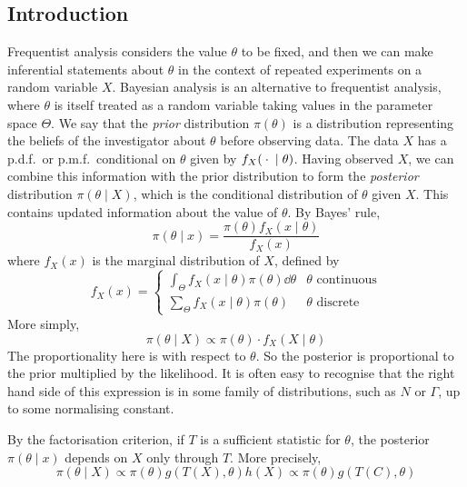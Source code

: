 \subsection{Introduction}
Frequentist analysis considers the value \( \theta \) to be fixed, and then we can make inferential statements about \( \theta \) in the context of repeated experiments on a random variable \( X \).
Bayesian analysis is an alternative to frequentist analysis, where \( \theta \) is itself treated as a random variable taking values in the parameter space \( \Theta \).
We say that the \textit{prior} distribution \( \pi(\theta) \) is a distribution representing the beliefs of the investigator about \( \theta \) before observing data.
The data \( X \) has a p.d.f.\ or p.m.f.\ conditional on \( \theta \) given by \( f_X({}\cdot{} \mid \theta) \).
Having observed \( X \), we can combine this information with the prior distribution to form the \textit{posterior} distribution \( \pi(\theta \mid X) \), which is the conditional distribution of \( \theta \) given \( X \).
This contains updated information about the value of \( \theta \).
By Bayes' rule,
\[
	\pi(\theta \mid x) = \frac{\pi(\theta) f_X(x \mid \theta)}{f_X(x)}
\]
where \( f_X(x) \) is the marginal distribution of \( X \), defined by
\[
	f_X(x) = \begin{cases}
		\int_\Theta f_X(x\mid\theta) \pi(\theta) \dd{\theta} & \theta \text{ continuous} \\
		\sum_\Theta f_X(x\mid\theta) \pi(\theta)             & \theta \text{ discrete}
	\end{cases}
\]
More simply,
\[
	\pi(\theta \mid X) \propto \pi(\theta) \cdot f_X(X \mid \theta)
\]
The proportionality here is with respect to \( \theta \).
So the posterior is proportional to the prior multiplied by the likelihood.
It is often easy to recognise that the right hand side of this expression is in some family of distributions, such as \( N \) or \( \Gamma \), up to some normalising constant.
\begin{remark}
	By the factorisation criterion, if \( T \) is a sufficient statistic for \( \theta \), the posterior \( \pi(\theta \mid x) \) depends on \( X \) only through \( T \).
	More precisely,
	\[
		\pi(\theta \mid X) \propto \pi(\theta) g(T(X),\theta) h(X) \propto \pi(\theta) g(T(C),\theta)
	\]
\end{remark}
